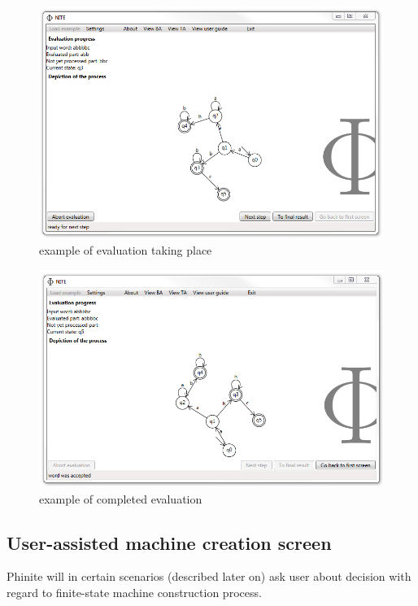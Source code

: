 \documentclass{article}
\begin{document}
\begin{figure}[ht!]
  \centering
  \includegraphics[width=.85\textwidth]{../../graphics/Screen6.png}
  \caption{example of evaluation taking place}
\end{figure}

\begin{figure}[ht!]
  \centering
  \includegraphics[width=.85\textwidth]{../../graphics/Screen7.png}
  \caption{example of completed evaluation}
\end{figure}

\newpage

\subsection{User-assisted machine creation screen}

Phinite will in certain scenarios (described later on) ask user about decision with regard to
finite-state machine construction process.
\end{document}
